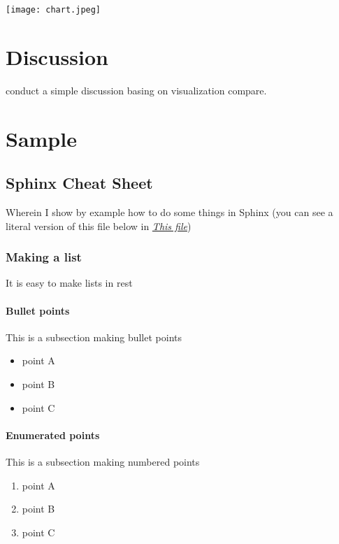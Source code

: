 \documentclass[letterpaper,10pt,openany, oneside]{sphinxmanual}
\begin{document}
\texttt{[image: chart.jpeg]}


\chapter{Discussion}
\label{discussion:discussion}\label{discussion::doc}
conduct a simple discussion basing on visualization compare.


\chapter{Sample}
\label{sample:sample}\label{sample::doc}

\section{Sphinx Cheat Sheet}
\label{sample:sphinx-cheat-sheet}\label{sample:sphinx-helpers}
Wherein I show by example how to do some things in Sphinx (you can see
a literal version of this file below in {\hyperref[sample:sphinx-literal]{\emph{This file}}})


\subsection{Making a list}
\label{sample:id1}\label{sample:making-a-list}
It is easy to make lists in rest


\subsubsection{Bullet points}
\label{sample:bullet-points}
This is a subsection making bullet points
\begin{itemize}
\item {} 
point A

\item {} 
point B

\item {} 
point C

\end{itemize}


\subsubsection{Enumerated points}
\label{sample:enumerated-points}
This is a subsection making numbered points
\begin{enumerate}
\item {} 
point A

\item {} 
point B

\item {} 
point C

\end{enumerate}
\end{document}
